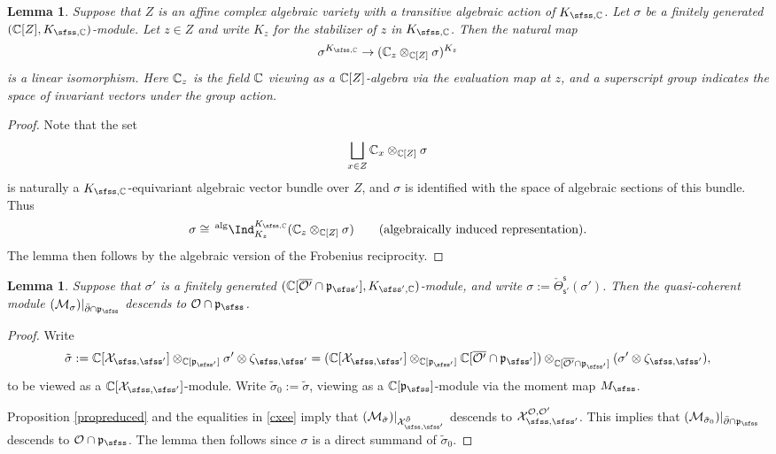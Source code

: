 \documentclass[11pt,a4paper]{amsart}
\newcommand{\CM}{{\mathcal {M}}}
\newcommand{\CO}{{\mathcal {O}}}
\newcommand{\CX}{{\mathcal {X}}}
\newcommand{\p}{\mathfrak p}
\numberwithin{equation}{section}
\newtheorem{lem}[thm]{Lemma}
\theoremstyle{remark}
\begin{document}
\begin{lem}\label{geotheta2}
Suppose that  $Z$ is an affine complex algebraic variety with a transitive algebraic action of $K_{\sfss, \C}$. Let $\sigma$ be a finitely generated $(\C[Z], K_{\sfss, \C})$-module.
Let $z\in Z$ and write $K_z$ for the stabilizer of $z$ in $K_{\sfss, \C}$. Then  the natural map
\[
  \sigma^{K_{\sfss, \C}}\rightarrow (\C_z\otimes_{\C[Z]} \sigma)^{K_{z}}
\]
is a linear isomorphism. Here $\mathbb{C}_z$ is the field $\mathbb{C}$ viewing as a $\mathbb{C}[Z]$-algebra via the evaluation map at $z$, and a superscript group indicates the space of  invariant vectors under the group action.
\end{lem}
\begin{proof}
Note that the set
\[
 \bigsqcup_{x\in Z} \mathbb{C}_x\otimes_{\mathbb{C}[Z]} \sigma
\]
is naturally a $K_{\sfss, \C}$-equivariant algebraic vector bundle over $Z$, and  $\sigma$ is identified with the space of algebraic sections of this bundle. Thus
\[
  \sigma\cong \,^{\mathrm{alg}}\Ind_{K_z}^{K_{\sfss, \C}}(\C_z\otimes_{\C[Z]}\sigma)\qquad(\textrm{algebraically induced representation}).
\]
The lemma then follows by the algebraic version of the Frobenius reciprocity.
\end{proof}


\begin{lem}\label{geotheta3}
Suppose that $\sigma'$ is a finitely generated  $(\C[\overline{\CO'}\cap \p_{\sfss'}], K_{\sfss', \C})$-module, and write $\sigma:=\check \Theta_{\mathsf s'}^{\mathsf s}(\sigma')$. Then the  quasi-coherent module $(\CM_\sigma)|_{\bar \partial \cap \p_\sfss}$ descends  to $\CO\cap \p_\sfss$.
\end{lem}
\begin{proof}
Write
\[
 \tilde \sigma:=\C[\CX_{\sfss, \sfss'}]\otimes_{\C[\p_{\sfss'}]} \sigma'\otimes \zeta_{\sfss, \sfss'}=(\C[\CX_{\sfss, \sfss'}]\otimes_{\C[\p_{\sfss'}]} {\C[\overline{\CO'}\cap \p_{\sfss'}]})\otimes_{\C[\overline{\CO'}\cap \p_{\sfss'}]}(\sigma'\otimes \zeta_{\sfss, \sfss'}),
\]
to be viewed as a $\C[\CX_{\sfss, \sfss'}]$-module. Write $\tilde \sigma_0:=\tilde \sigma$, viewing as a $\C[\p_\sfss]$-module via the moment map $M_\sfss$.

Proposition \ref{propreduced} and the equalities  in \eqref{cxee} imply that
$(\CM_{ \tilde \sigma})|_{\CX_{\sfss, \sfss'}^{\bar \partial}}$ descends to $ \CX_{\sfss, \sfss'}^{\CO, \CO'}$. This implies that $(\CM_{ \tilde \sigma_0})|_{\bar \partial\cap \p_\sfss}$ descends to $ \CO\cap \p_\sfss$. The lemma then follows since $\sigma$ is a direct summand of $\tilde \sigma_0$.
\end{proof}
\end{document}
